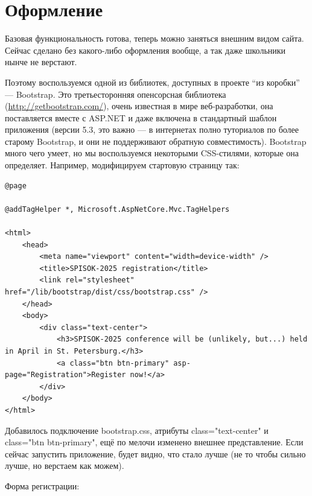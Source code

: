 \documentclass{../../text-style}
\begin{document}
\section{Оформление}

Базовая функциональность готова, теперь можно заняться внешним видом сайта. Сейчас сделано без какого-либо оформления вообще, а так даже школьники нынче не верстают. 

Поэтому воспользуемся одной из библиотек, доступных в проекте \enquote{из коробки} --- Bootstrap. Это третьесторонняя опенсорсная библиотека 
(\url{http://getbootstrap.com/}), очень известная в мире веб-разработки, она поставляется вместе с ASP.NET и даже включена в стандартный шаблон приложения (версии 5.3, это важно --- в интернетах полно туториалов по более старому Bootstrap, и они не поддерживают обратную совместимость). Bootstrap много чего умеет, но мы воспользуемся некоторыми CSS-стилями, которые она определяет. Например, модифицируем
стартовую страницу так:

\begin{verbatim}
@page

@addTagHelper *, Microsoft.AspNetCore.Mvc.TagHelpers

<html>
    <head>
        <meta name="viewport" content="width=device-width" />
        <title>SPISOK-2025 registration</title>
        <link rel="stylesheet" href="/lib/bootstrap/dist/css/bootstrap.css" />
    </head>
    <body>
        <div class="text-center">
            <h3>SPISOK-2025 conference will be (unlikely, but...) held in April in St. Petersburg.</h3>
            <a class="btn btn-primary" asp-page="Registration">Register now!</a>
        </div>
    </body>
</html>
\end{verbatim}

Добавилось подключение bootstrap.css, атрибуты class="text-center" и class="btn btn-primary", ещё по мелочи изменено внешнее представление. Если сейчас запустить приложение, будет видно, что стало лучше (не то чтобы сильно лучше, но верстаем как можем).

Форма регистрации:
\end{document}
